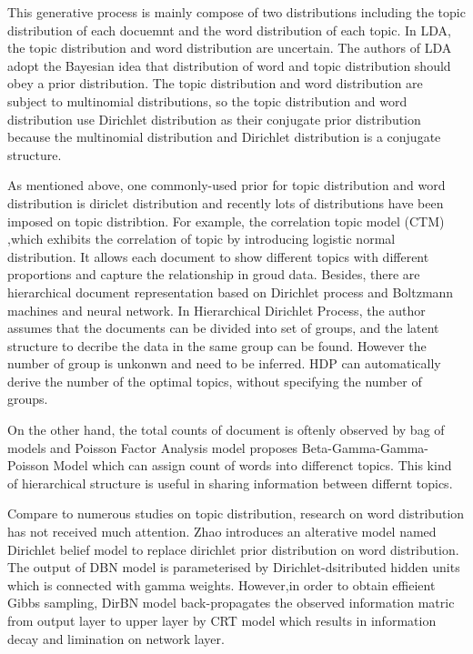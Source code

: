 This generative process is mainly compose of two distributions including the topic distribution of each docuemnt and the word distribution of each topic. In LDA, the topic distribution and word distribution are uncertain. The authors of LDA adopt the Bayesian idea that distribution of word and topic distribution should obey a prior distribution. The topic distribution and word distribution are subject to  multinomial distributions, so the topic distribution and word distribution use Dirichlet distribution as their conjugate prior distribution because the multinomial distribution and Dirichlet distribution is a conjugate structure.

As mentioned above, one commonly-used prior for topic distribution and word distribution is diriclet distribution and recently lots of distributions have been imposed on topic distribtion. For example, the correlation topic model (CTM) \cite{corr} ,which exhibits the correlation of topic by introducing logistic normal distribution. It allows each document to show different topics with different proportions and capture the relationship in groud data.    Besides, there are hierarchical document representation based on Dirichlet process and Boltzmann machines and neural network\cite{dirbn}. In Hierarchical Dirichlet Process\cite{hdp}, the author assumes that the documents can be divided into set of groups, and the latent structure to  decribe the data in the same group can be found. However the number of group is unkonwn and need to be inferred. HDP  can automatically derive the number of the optimal topics, without specifying the number of groups.

On the other hand, the total counts of document is oftenly observed by bag of models and Poisson Factor Analysis model\cite{han} proposes Beta-Gamma-Gamma-Poisson Model which can assign count of words into differenct topics. This kind of hierarchical structure is useful in sharing information between differnt topics.

Compare to numerous studies on topic distribution, research on word distribution has not received much attention. Zhao\cite{dirbn} introduces an alterative model named Dirichlet belief model to replace dirichlet prior distribution on word distribution. The output of DBN model is parameterised by Dirichlet-dsitributed hidden units which is connected with gamma weights. However,in order to obtain effieient Gibbs sampling, DirBN model back-propagates the observed information matric from output layer to upper layer by CRT\cite{crt} model which results in information decay and limination on network layer.

